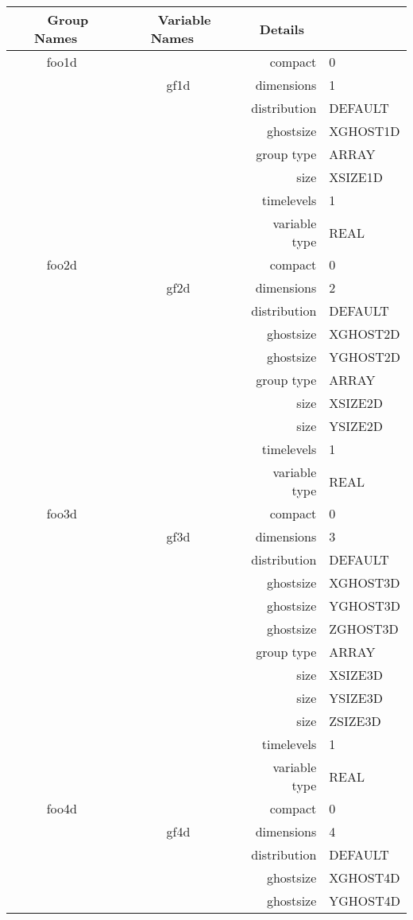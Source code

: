 \begin{tabular*}{150mm}{|c|c@{\extracolsep{\fill}}|rl|} \hline 
~ {\bf Group Names} ~ & ~ {\bf Variable Names} ~  &{\bf Details} ~ & ~\\ 
\hline 
foo1d &  & compact & 0 \\ 
 & gf1d & dimensions & 1 \\ 
 &  & distribution & DEFAULT \\ 
 &  & ghostsize & XGHOST1D \\ 
 &  & group type & ARRAY \\ 
 &  & size & XSIZE1D \\ 
 &  & timelevels & 1 \\ 
 &  & variable type & REAL \\ 
\hline 
foo2d &  & compact & 0 \\ 
 & gf2d & dimensions & 2 \\ 
 &  & distribution & DEFAULT \\ 
 &  & ghostsize & XGHOST2D \\ 
& ~ & ghostsize & YGHOST2D \\ 
 &  & group type & ARRAY \\ 
 &  & size & XSIZE2D \\ 
& ~ & size & YSIZE2D \\ 
 &  & timelevels & 1 \\ 
 &  & variable type & REAL \\ 
\hline 
foo3d &  & compact & 0 \\ 
 & gf3d & dimensions & 3 \\ 
 &  & distribution & DEFAULT \\ 
 &  & ghostsize & XGHOST3D \\ 
& ~ & ghostsize & YGHOST3D \\ 
 &  & ghostsize & ZGHOST3D \\ 
 &  & group type & ARRAY \\ 
 &  & size & XSIZE3D \\ 
& ~ & size & YSIZE3D \\ 
 &  & size & ZSIZE3D \\ 
 &  & timelevels & 1 \\ 
 &  & variable type & REAL \\ 
\hline 
foo4d &  & compact & 0 \\ 
 & gf4d & dimensions & 4 \\ 
 &  & distribution & DEFAULT \\ 
 &  & ghostsize & XGHOST4D \\ 
& ~ & ghostsize & YGHOST4D \\ 

\end{tabular*}
